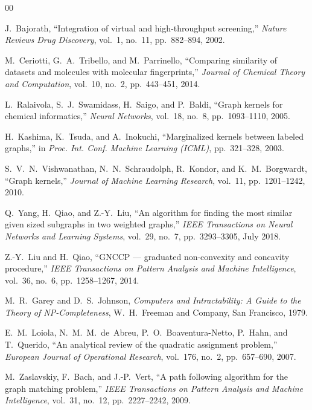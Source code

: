 \documentclass[conference]{IEEEtran}
\begin{document}
\begin{thebibliography}{00}

J.~Bajorath,
``Integration of virtual and high-throughput screening,''
\textit{Nature Reviews Drug Discovery},
vol.~1, no.~11, pp.~882--894, 2002.

M.~Ceriotti, G.~A.~Tribello, and M.~Parrinello,
``Comparing similarity of datasets and molecules with molecular fingerprints,''
\textit{Journal of Chemical Theory and Computation},
vol.~10, no.~2, pp.~443--451, 2014.

L.~Ralaivola, S.~J.~Swamidass, H.~Saigo, and P.~Baldi,
``Graph kernels for chemical informatics,''
\textit{Neural Networks},
vol.~18, no.~8, pp.~1093--1110, 2005.

H.~Kashima, K.~Tsuda, and A.~Inokuchi,
``Marginalized kernels between labeled graphs,''
in \textit{Proc. Int. Conf. Machine Learning (ICML)},
pp.~321--328, 2003.

S.~V.~N.~Vishwanathan, N.~N.~Schraudolph, R.~Kondor, and K.~M.~Borgwardt,
``Graph kernels,''
\textit{Journal of Machine Learning Research},
vol.~11, pp.~1201--1242, 2010.

Q.~Yang, H.~Qiao, and Z.-Y.~Liu,
``An algorithm for finding the most similar given sized subgraphs in two weighted graphs,''
\textit{IEEE Transactions on Neural Networks and Learning Systems},
vol.~29, no.~7, pp.~3293--3305, July 2018.

Z.-Y.~Liu and H.~Qiao,
``GNCCP --- graduated non-convexity and concavity procedure,''
\textit{IEEE Transactions on Pattern Analysis and Machine Intelligence},
vol.~36, no.~6, pp.~1258--1267, 2014.

M.~R.~Garey and D.~S.~Johnson,
\textit{Computers and Intractability: A Guide to the Theory of NP-Completeness},
W.~H.~Freeman and Company, San Francisco, 1979.

E.~M.~Loiola, N.~M.~M.~de~Abreu, P.~O.~Boaventura-Netto, P.~Hahn, and T.~Querido,
``An analytical review of the quadratic assignment problem,''
\textit{European Journal of Operational Research},
vol.~176, no.~2, pp.~657--690, 2007.

M.~Zaslavskiy, F.~Bach, and J.-P.~Vert,
``A path following algorithm for the graph matching problem,''
\textit{IEEE Transactions on Pattern Analysis and Machine Intelligence},
vol.~31, no.~12, pp.~2227--2242, 2009.


\end{thebibliography}
\end{document}
